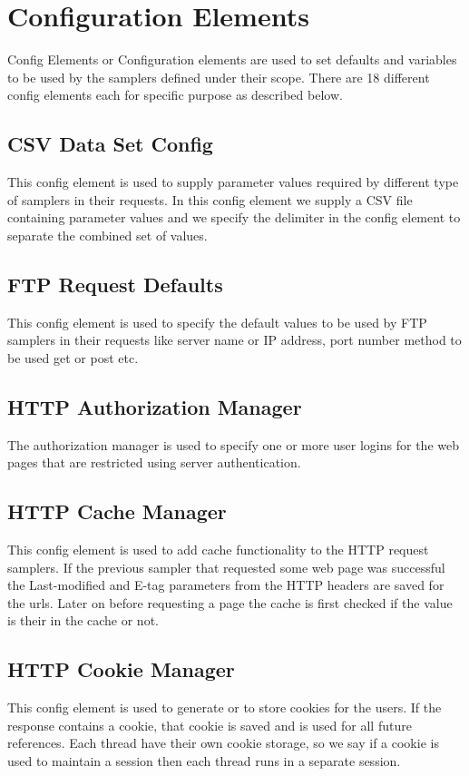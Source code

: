 \documentclass[12pt]{book}
\begin{document}
\section{Configuration Elements}
Config Elements or Configuration elements are used to set defaults and variables to be used by
the samplers defined under their scope. There are 18 different config elements each for specific
purpose as described below.\cite{Ehh} \cite{Jmeter} \cite{Manual}

 \subsection{CSV Data Set Config}
 This config element is used to supply parameter values required
by different type of samplers in their requests. In this config element we supply a CSV file
containing parameter values and we specify the delimiter in the config element to separate the
combined set of values.

 \subsection{FTP Request Defaults}
 This config element is used to specify the default values to be
used by FTP samplers in their requests like server name or IP address, port number
method to be used get or post etc.

 \subsection{HTTP Authorization Manager}
 The authorization manager is used to specify one or more user logins for the web pages that are restricted using server authentication.
 
 \subsection{HTTP Cache Manager}
 This config element is used to add cache functionality to the
HTTP request samplers. If the previous sampler that requested some web page was successful
the Last-modified and E-tag parameters from the HTTP headers are saved for the urls. Later on
before requesting a page the cache is first checked if the value is their in the cache or not.

 \subsection{HTTP Cookie Manager}
 This config element is used to generate or to store cookies
for the users. If the response contains a cookie, that cookie is saved and is used for all future
references. Each thread have their own cookie storage, so we say if a cookie is used to maintain a
session then each thread runs in a separate session.
\end{document}
